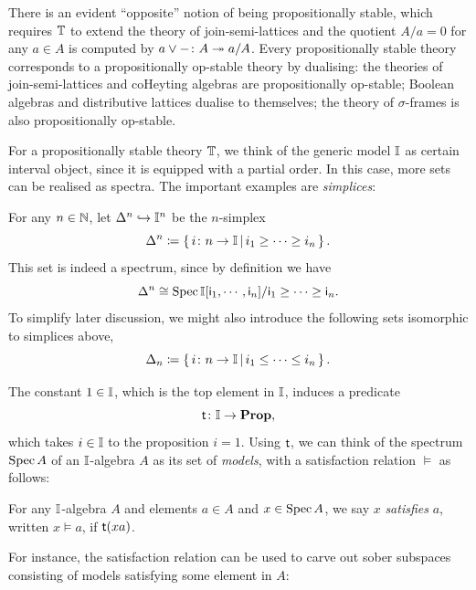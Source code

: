 \begin{remark}\label{rem:opprop}
  There is an evident ``opposite'' notion of being propositionally stable, which requires $\mathbb{T}$ to extend the theory of join-semi-lattices and the quotient $A/a = 0$ for any $a\in A$ is computed by ${a \vee -} \colon A \twoheadrightarrow a/A$. Every propositionally stable theory corresponds to a propositionally op-stable theory by dualising: the theories of join-semi-lattices and coHeyting algebras are propositionally op-stable; Boolean algebras and distributive lattices dualise to themselves; the theory of $\sigma$-frames is also propositionally op-stable.
\end{remark}

For a propositionally stable theory $\mathbb{T}$, we think of the generic model $\mathbb{I}$ as certain interval object, since it is equipped with a partial order. In this case, more sets can be realised as spectra. The important examples are \emph{simplices}:

\begin{example}\label{exm:simplicessober}
  For any $n \in \mathbb{N}$, let $\Delta^n \hookrightarrow \mathbb{I}^n$ be the $n$-simplex
  \[ \Delta^n \coloneq \left\{\,i \colon n \to \mathbb{I}\,\middle|\,i_1 \ge \cdots \ge i_n\,\right\}\text{.} \]
  This set is indeed a spectrum, since by definition we have
  \[ \Delta^n \cong \operatorname{Spec}\mathbb{I}[\mathsf{i}_1,\cdots,\mathsf{i}_n]/\mathsf{i}_1\ge\cdots\ge \mathsf{i}_n\text{.} \]
  To simplify later discussion, we might also introduce the following sets isomorphic to simplices above,
  \[ \Delta_n \coloneq \left\{\,i \colon n \to \mathbb{I}\,\middle|\,i_1 \le \cdots \le i_n\,\right\}\text{.} \]
\end{example}

The constant $1 \in \mathbb{I}$, which is the top element in $\mathbb{I}$, induces a predicate
\[ \mathsf{t}\colon \mathbb{I} \to \mathbf{Prop}\text{,} \]
which takes $i \in \mathbb{I}$ to the proposition $i = 1$. Using $\mathsf{t}$, we can think of the spectrum $\operatorname{Spec} A$ of an $\mathbb{I}$-algebra $A$ as its set of \emph{models}, with a satisfaction relation $\models$ as follows:

\begin{definition}[Satisfaction]
  For any $\mathbb{I}$-algebra $A$ and elements $a\in A$ and $x\in \operatorname{Spec} A$, we say $x$ \emph{satisfies} $a$, written $x \models a$, if $\mathsf{t}(xa)$.
\end{definition}

For instance, the satisfaction relation can be used to carve out sober subspaces consisting of models satisfying some element in $A$:


